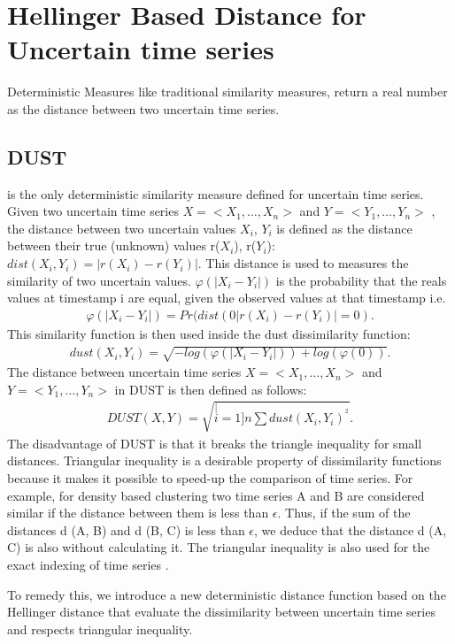 \chapter{Hellinger Based Distance for Uncertain time series}
\label{helinger}
Deterministic Measures like traditional similarity measures, return a real number as
the distance between two uncertain time series. 
\section{DUST}
\cite{murthy2013generalized} is the only
deterministic similarity measure defined for uncertain time series. Given two uncertain time series $X=<X_1, \ldots,X_n>$ and $Y=<Y_1, \ldots,Y_n>$ , the distance between
two uncertain values $X_i$, $Y_i$ is defined as the distance between their true (unknown) values
r($X_i$), r($Y_i$): $dist(X_i, Y_i) = |r(X_i) - r(Y_i)|$. This distance is used to measures the
similarity of two uncertain values. $\varphi(|X_{i}-Y_{i}|)$ is the probability that the reals values at timestamp i are equal, given
the observed values at that timestamp i.e.
\begin{eqnarray}
\varphi(|X_{i}-Y_{i}|)=Pr(dist(0|r(X_{i})-r(Y_{i})|=0).
\end{eqnarray}
This similarity function is then used inside the dust dissimilarity function:
\begin{eqnarray}
dust(X_{i},Y_{i})=\sqrt{-log(\varphi(|X_{i}-Y_{i}|))+log(\varphi(0))}.
\end{eqnarray}
The distance between uncertain time series $X=<X_1, \ldots,X_n>$ and\\ $Y=<Y_1, \ldots,Y_n>$ in DUST
is then defined as follows:
\begin{eqnarray}
DUST(X,Y)=\sqrt{\stackrel[i=1]{n}{\sum}dust(X_{i},Y_{i})^{^{2}}}.
\end{eqnarray} 
The disadvantage of DUST is that it  breaks the triangle inequality for small distances. Triangular inequality is a desirable property of dissimilarity functions because it makes it possible to speed-up the comparison of time series. For example, for density based clustering two time series A and B are considered similar if the distance between them is less than $\epsilon$. Thus, if the sum of the distances d (A, B) and d (B, C) is less than $\epsilon$, we deduce that the distance d (A, C) is also without calculating it. The triangular inequality is also used for the exact indexing of time series \cite{keogh2001locally}.


To remedy this, we introduce a new deterministic distance function based on the
Hellinger distance that evaluate the dissimilarity between uncertain time series and respects triangular
inequality.

